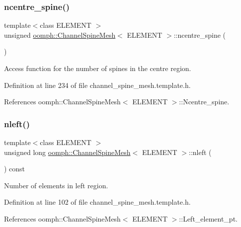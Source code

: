 \subsubsection{\texorpdfstring{ncentre\+\_\+spine()}{ncentre\_spine()}}
{\footnotesize\ttfamily template$<$class E\+L\+E\+M\+E\+NT $>$ \\
unsigned \hyperlink{classoomph_1_1ChannelSpineMesh}{oomph\+::\+Channel\+Spine\+Mesh}$<$ E\+L\+E\+M\+E\+NT $>$\+::ncentre\+\_\+spine (\begin{DoxyParamCaption}{ }\end{DoxyParamCaption})\hspace{0.3cm}{\ttfamily [inline]}}



Access function for the number of spines in the centre region. 



Definition at line 234 of file channel\+\_\+spine\+\_\+mesh.\+template.\+h.



References oomph\+::\+Channel\+Spine\+Mesh$<$ E\+L\+E\+M\+E\+N\+T $>$\+::\+Ncentre\+\_\+spine.

\mbox{\label{classoomph_1_1ChannelSpineMesh_a6f7b8f540855876e49b5f1c3f0214d9a}} 
\subsubsection{\texorpdfstring{nleft()}{nleft()}}
{\footnotesize\ttfamily template$<$class E\+L\+E\+M\+E\+NT $>$ \\
unsigned long \hyperlink{classoomph_1_1ChannelSpineMesh}{oomph\+::\+Channel\+Spine\+Mesh}$<$ E\+L\+E\+M\+E\+NT $>$\+::nleft (\begin{DoxyParamCaption}{ }\end{DoxyParamCaption}) const\hspace{0.3cm}{\ttfamily [inline]}}



Number of elements in left region. 



Definition at line 102 of file channel\+\_\+spine\+\_\+mesh.\+template.\+h.



References oomph\+::\+Channel\+Spine\+Mesh$<$ E\+L\+E\+M\+E\+N\+T $>$\+::\+Left\+\_\+element\+\_\+pt.



